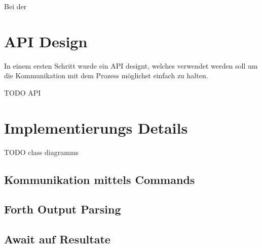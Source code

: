 Bei der

\section{API Design}

In einem ersten Schritt wurde ein API designt, welches verwendet werden soll um die Kommunikation mit dem Prozess möglichst einfach zu halten.

TODO API

\section{Implementierungs Details}

TODO class diagramms

\subsection{Kommunikation mittels Commands}

\subsection{Forth Output Parsing}

\subsection{Await auf Resultate}


